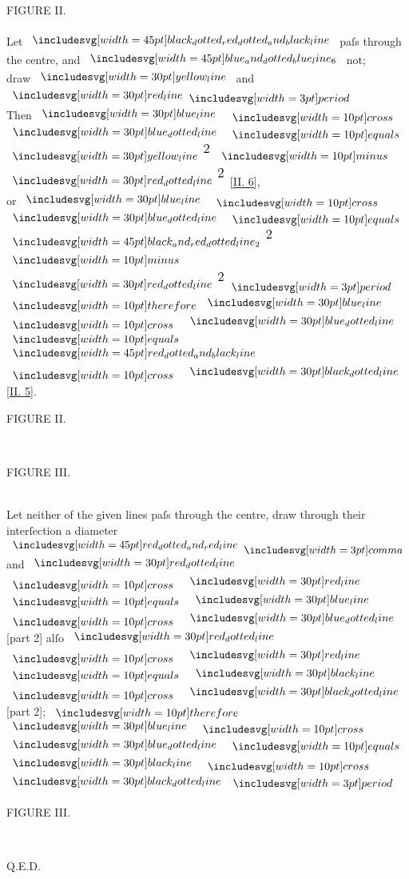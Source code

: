 \documentclass[11pt,preview]{standalone}
\begin{document}
\hfill

\begin{minipage}[t]{0.54\textwidth}
    \vspace{0pt}

    \begin{center}
        FIGURE II.\\
        \hfill\\
        Let $\bimg{black_dotted_red_dotted_and_black_line}$ paſs through the centre, and
        $\bimg{blue_and_dotted_blue_line_6}$ not;\\
        draw $\yellowline$ and $\redline \bperiod$\\
        Then $\blueline$ $\bcross$ $\dottedblueline$ $\bequals$ $\yellowline^{\text{\large 2}}$ $\bminus$ $\dottedredline^{\text{\large 2}}$ [\hyperref[book2pr6]{\textsc{II.} 6}], \\
        or $\blueline$ $\bcross$ $\dottedblueline$ $\bequals$ $\bimg{black_and_red_dotted_line_2}^{\text{\large 2}}$ $\bminus$ $\dottedredline^{\text{\large 2}}$ $\bperiod$ $\btherefore \blueline$ $\bcross$ $\dottedblueline$ $\bequals$ $\bimg{red_dotted_and_black_line}$ $\bcross$ $\dottedblackline$ [\hyperref[book2pr5]{\textsc{II.} 5}].
    \end{center}
\end{minipage}%
\hfill
\begin{minipage}[t]{0.43\textwidth}
    \vspace{0pt}
    \begin{center}
        FIGURE II.
    \end{center}
    \hfill\\
    
\end{minipage}%

\hfill

\begin{minipage}[t]{0.54\textwidth}
    \vspace{0pt}

    \begin{center}
        FIGURE III.\\
        \hfill\\
        \raggedright Let neither of the given lines paſs through the centre, draw through their interſection a diameter $\bimg{red_dotted_and_red_line} \bcomma$ and $\dottedredline$ $\bcross$ $\redline$ $\bequals$ $\blueline$ $\bcross$ $\dottedblueline$ [part 2] alſo $\dottedredline$ $\bcross$ $\redline$  $\bequals$ $\blackline$ $\bcross$ $\dottedblackline$ [part 2]; $\btherefore$ $\blueline$ $\bcross$ $\dottedblueline$ $\bequals$ $\blackline$ $\bcross$ $\dottedblackline$ $\bperiod$
    \end{center}

\end{minipage}%
\hfill
\begin{minipage}[t]{0.43\textwidth}
    \vspace{0pt}
    \begin{center}
        FIGURE III.
    \end{center}
    \hfill\\
    
\end{minipage}%

\hfill

\hfill Q.E.D.
\end{document}
